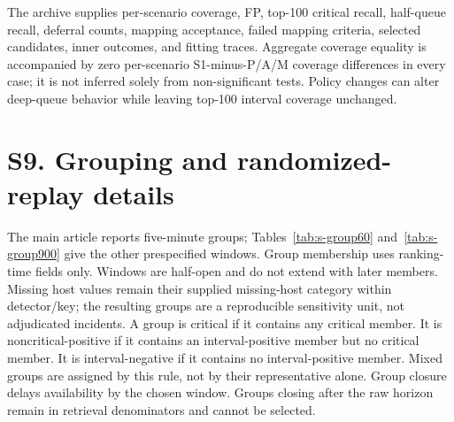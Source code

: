 \begin{tableorg}[htbp]
\centering\small
\caption{Sensitivity outcomes: covered intervals / median FP@100. Denominators and critical-record counts vary only in endpoint-changing cases. All nine class-level formulas cover eight intervals in each case; P and S1 show the corresponding burdens.}
\label{tab:s-policy}
\resizebox{\textwidth}{!}{}
\end{tableorg}

The archive supplies per-scenario coverage, FP, top-100 critical recall, half-queue recall, deferral counts, mapping acceptance, failed mapping criteria, selected candidates, inner outcomes, and fitting traces. Aggregate coverage equality is accompanied by zero per-scenario S1-minus-P/A/M coverage differences in every case; it is not inferred solely from non-significant tests. Policy changes can alter deep-queue behavior while leaving top-100 interval coverage unchanged.

\FloatBarrier
\section*{S9. Grouping and randomized-replay details}
The main article reports five-minute groups; Tables~\ref{tab:s-group60} and~\ref{tab:s-group900} give the other prespecified windows. Group membership uses ranking-time fields only. Windows are half-open and do not extend with later members. Missing host values remain their supplied missing-host category within detector/key; the resulting groups are a reproducible sensitivity unit, not adjudicated incidents. A group is critical if it contains any critical member. It is noncritical-positive if it contains an interval-positive member but no critical member. It is interval-negative if it contains no interval-positive member. Mixed groups are assigned by this rule, not by their representative alone. Group closure delays availability by the chosen window. Groups closing after the raw horizon remain in retrieval denominators and cannot be selected.

\begin{tableorg}[htbp]
\centering\small
\caption{Closed 60-second groups at 12 groups/h. Definitions match the main grouped-replay table.}
\label{tab:s-group60}
\resizebox{\textwidth}{!}{}
\end{tableorg}
\begin{tableorg}[htbp]
\centering\small
\caption{Closed 900-second groups at 12 groups/h. Definitions match the main grouped-replay table.}
\label{tab:s-group900}
\resizebox{\textwidth}{!}{}
\end{tableorg}


